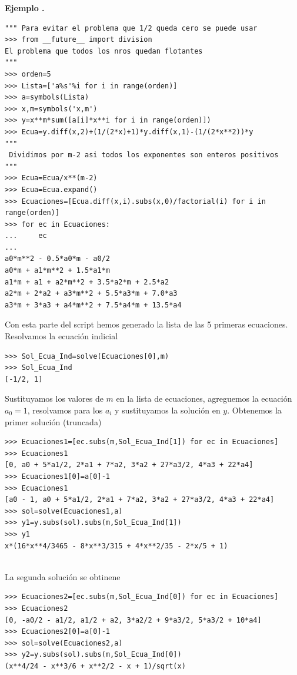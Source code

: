 \documentclass{article}
\newcounter{lem_cont}
\newcounter{ejem_cont}
\newenvironment{ejemplo}[1]{\refstepcounter{ejem_cont}\vspace{1ex}\noindent\textbf{Ejemplo \arabic{ejem_cont}.} #1}{}
\begin{document}
\begin{ejemplo}
\begin{lstlisting}
""" Para evitar el problema que 1/2 queda cero se puede usar
>>> from __future__ import division
El problema que todos los nros quedan flotantes
"""
>>> orden=5
>>> Lista=['a%s'%i for i in range(orden)]
>>> a=symbols(Lista)
>>> x,m=symbols('x,m')
>>> y=x**m*sum([a[i]*x**i for i in range(orden)])
>>> Ecua=y.diff(x,2)+(1/(2*x)+1)*y.diff(x,1)-(1/(2*x**2))*y
"""
 Dividimos por m-2 asi todos los exponentes son enteros positivos
"""
>>> Ecua=Ecua/x**(m-2)
>>> Ecua=Ecua.expand()
>>> Ecuaciones=[Ecua.diff(x,i).subs(x,0)/factorial(i) for i in range(orden)]
>>> for ec in Ecuaciones:
...     ec
... 
a0*m**2 - 0.5*a0*m - a0/2
a0*m + a1*m**2 + 1.5*a1*m
a1*m + a1 + a2*m**2 + 3.5*a2*m + 2.5*a2
a2*m + 2*a2 + a3*m**2 + 5.5*a3*m + 7.0*a3
a3*m + 3*a3 + a4*m**2 + 7.5*a4*m + 13.5*a4
\end{lstlisting}

Con esta parte del script hemos generado la lista de las 5 primeras ecuaciones.
Resolvamos la ecuación indicial

\begin{lstlisting}
>>> Sol_Ecua_Ind=solve(Ecuaciones[0],m)
>>> Sol_Ecua_Ind
[-1/2, 1]
\end{lstlisting}

Sustituyamos los valores de $m$ en la lista de ecuaciones, agreguemos la ecuación $a_0=1$, resolvamos para los $a_i$ y sustituyamos la solución en $y$. Obtenemos la primer solución (truncada) 
\begin{lstlisting}
>>> Ecuaciones1=[ec.subs(m,Sol_Ecua_Ind[1]) for ec in Ecuaciones]
>>> Ecuaciones1
[0, a0 + 5*a1/2, 2*a1 + 7*a2, 3*a2 + 27*a3/2, 4*a3 + 22*a4]
>>> Ecuaciones1[0]=a[0]-1
>>> Ecuaciones1
[a0 - 1, a0 + 5*a1/2, 2*a1 + 7*a2, 3*a2 + 27*a3/2, 4*a3 + 22*a4]
>>> sol=solve(Ecuaciones1,a)
>>> y1=y.subs(sol).subs(m,Sol_Ecua_Ind[1])
>>> y1
x*(16*x**4/3465 - 8*x**3/315 + 4*x**2/35 - 2*x/5 + 1)


\end{lstlisting}
La segunda solución se obtinene
\begin{lstlisting}
>>> Ecuaciones2=[ec.subs(m,Sol_Ecua_Ind[0]) for ec in Ecuaciones]
>>> Ecuaciones2
[0, -a0/2 - a1/2, a1/2 + a2, 3*a2/2 + 9*a3/2, 5*a3/2 + 10*a4]
>>> Ecuaciones2[0]=a[0]-1
>>> sol=solve(Ecuaciones2,a)
>>> y2=y.subs(sol).subs(m,Sol_Ecua_Ind[0])
(x**4/24 - x**3/6 + x**2/2 - x + 1)/sqrt(x)

\end{lstlisting}



\end{ejemplo}
\end{document}
